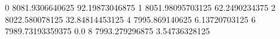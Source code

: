 0 8081.9306640625 92.19873046875
1 8051.98095703125 62.2490234375
2 8022.580078125 32.84814453125
4 7995.869140625 6.13720703125
6 7989.73193359375 0.0
8 7993.279296875 3.54736328125
